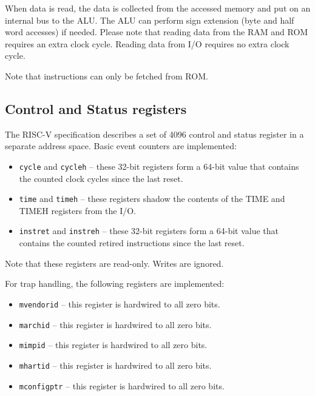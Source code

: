 \documentclass[12pt]{article}
\begin{document}
When data is read, the data is collected from the accessed memory and put on an internal bus to the ALU. The ALU can perform sign extension (byte and half word accesses) if needed. Please note that reading data from the RAM and ROM requires an extra clock cycle. Reading data from I/O requires no extra clock cycle.

Note that instructions can only be fetched from ROM.

\subsection{Control and Status registers}
The RISC-V specification describes a set of 4096 control and status register in a separate address space. Basic event counters are implemented:

\begin{itemize}
\item \texttt{cycle} and \texttt{cycleh} -- these 32-bit registers form a 64-bit value that contains the counted clock cycles since the last reset.
\item \texttt{time} and \texttt{timeh} -- these registers shadow the contents of the TIME and TIMEH registers from the I/O.
\item \texttt{instret} and \texttt{instreh} -- these 32-bit registers form a 64-bit value that contains the counted retired instructions since the last reset.
\end{itemize}

Note that these registers are read-only. Writes are ignored. 

For trap handling, the following registers are implemented:

\begin{itemize}
\item \texttt{mvendorid} -- this register is hardwired to all zero bits.
\item \texttt{marchid} -- this register is hardwired to all zero bits.
\item \texttt{mimpid} -- this register is hardwired to all zero bits.
\item \texttt{mhartid} -- this register is hardwired to all zero bits.
\item \texttt{mconfigptr} -- this register is hardwired to all zero bits.
\end{itemize}
\end{document}
